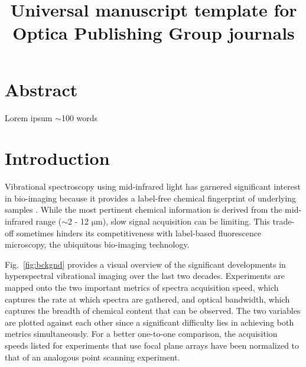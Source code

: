 \documentclass{optica-article}
\begin{document}
\title{Universal manuscript template for Optica Publishing Group journals}

\section{Abstract}
Lorem ipsum $\sim$100 words

\section{Introduction}
Vibrational spectroscopy using mid-infrared light has garnered significant interest in bio-imaging because it provides a label-free chemical fingerprint of underlying samples \cite{bakerUsingFourierTransform2014}.  While the most pertinent chemical information is derived from the mid-infrared range ($\sim$2 - 12 $\mathrm{\mu m}$), slow signal acquisition can be limiting. This trade-off sometimes hinders its competitiveness with label-based fluorescence microscopy, the ubiquitous bio-imaging technology.

\mbox{Fig. \ref{fig:bckgnd}} provides a visual overview of the significant developments in hyperspectral vibrational imaging over the last two decades. Experiments are mapped onto the two important metrics of spectra acquisition speed, which captures the rate at which spectra are gathered, and optical bandwidth, which captures the breadth of chemical content that can be observed. The two variables are plotted against each other since a significant difficulty lies in achieving both metrics simultaneously. For a better one-to-one comparison, the acquisition speeds listed for experiments that use focal plane arrays have been normalized to that of an analogous point scanning experiment.

\end{document}
